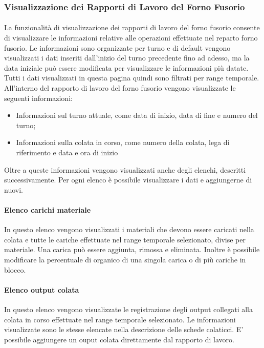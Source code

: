   \subsubsection{Visualizzazione dei Rapporti di Lavoro del Forno Fusorio}
  \paragraph{}
  La funzionalità di visualizzazione dei rapporti di lavoro del forno fusorio consente di visualizzare 
  le informazioni relative alle operazioni effettuate nel reparto forno fusorio. Le informazioni sono 
  organizzate per turno e di default vengono visualizzati i dati inseriti dall’inizio del turno 
  precedente fino ad adesso, ma la data iniziale può essere modificata per visualizzare le informazioni 
  più datate. Tutti i dati visualizzati in questa pagina quindi sono filtrati per range temporale.\\
  All’interno del rapporto di lavoro del forno fusorio vengono visualizzate le seguenti informazioni:
  \begin{itemize}
    \item Informazioni sul turno attuale, come data di inizio, data di fine e numero del turno;
    \item Informazioni sulla colata in corso, come numero della colata, lega di riferimento e data e ora 
    di inizio
  \end{itemize}
  Oltre a queste informazioni vengono visualizzati anche degli elenchi, descritti successivamente. 
  Per ogni elenco è possibile visualizzare i dati e aggiungerne di nuovi.
  \paragraph{Elenco carichi materiale}
  In questo elenco vengono visualizzati i materiali che devono essere caricati nella colata e 
  tutte le cariche effettuate nel range temporale selezionato, divise per materiale. 
  Una carica può essere aggiunta, rimossa e eliminata. Inoltre è possibile modificare la percentuale 
  di organico di una singola carica o di più cariche in blocco.

  \paragraph{Elenco output colata}
  In questo elenco vengono visualizzate le registrazione degli output collegati alla colata in corso 
  effettuate nel range temporale selezionato. Le informazioni visualizzate sono le stesse elencate 
  nella descrizione delle schede colaticci. E' possibile aggiungere un ouput colata direttamente dal 
  rapporto di lavoro.
  
